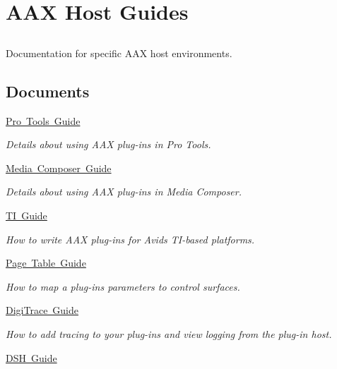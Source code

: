 \hypertarget{a00829}{}\section{A\+AX Host Guides}
\label{a00829}


\subsection{ }
Documentation for specific A\+AX host environments. 

\subsection*{Documents}
\begin{DoxyCompactItemize}
\item 
\mbox{\hyperlink{a00830}{Pro Tools Guide}}
\begin{DoxyCompactList}\small\item\em Details about using A\+AX plug-\/ins in Pro Tools. \end{DoxyCompactList}\item 
\mbox{\hyperlink{a00831}{Media Composer Guide}}
\begin{DoxyCompactList}\small\item\em Details about using A\+AX plug-\/ins in Media Composer. \end{DoxyCompactList}\item 
\mbox{\hyperlink{a00832}{T\+I Guide}}
\begin{DoxyCompactList}\small\item\em How to write A\+AX plug-\/ins for Avid\textquotesingle{}s T\+I-\/based platforms. \end{DoxyCompactList}\item 
\mbox{\hyperlink{a00833}{Page Table Guide}}
\begin{DoxyCompactList}\small\item\em How to map a plug-\/in\textquotesingle{}s parameters to control surfaces. \end{DoxyCompactList}\item 
\mbox{\hyperlink{a00834}{Digi\+Trace Guide}}
\begin{DoxyCompactList}\small\item\em How to add tracing to your plug-\/ins and view logging from the plug-\/in host. \end{DoxyCompactList}\item 
\mbox{\hyperlink{a00835}{D\+S\+H Guide}}

\end{DoxyCompactItemize}
